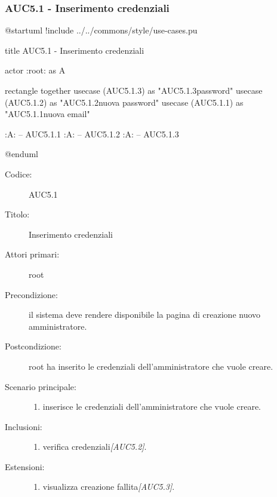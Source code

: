\documentclass[casi-duso]{subfiles}
\begin{document}
\subsubsection{AUC5.1 - Inserimento credenziali}%
\label{subsub:AUC5.1}

\begin{plantuml}
@startuml
!include ../../commons/style/use-cases.pu

title AUC5.1 - Inserimento credenziali

actor :root: as A

rectangle {
  together {
    usecase (AUC5.1.3) as "AUC5.1.3\nConferma password"
    usecase (AUC5.1.2) as "AUC5.1.2\nInserimento nuova password"
    usecase (AUC5.1.1) as "AUC5.1.1\nInserimento nuova email"
  }
}

:A: -- AUC5.1.1
:A: -- AUC5.1.2
:A: -- AUC5.1.3

@enduml
\end{plantuml}

\begin{description}
  \item[Codice:] AUC5.1
  \item[Titolo:] Inserimento credenziali
  \item[Attori primari:] root
  \item[Precondizione:] il sistema deve rendere disponibile la pagina di creazione nuovo amministratore.
  \item[Postcondizione:] root ha inserito le credenziali dell'amministratore che vuole creare.
  \item[Scenario principale:]
  \begin{enumerate}
    \item {} inserisce le credenziali dell'amministratore che vuole creare.
  \end{enumerate}
  \item[Inclusioni:]
  \begin{enumerate}
    \item verifica credenziali\emph{[AUC5.2]}.
  \end{enumerate}
  \item[Estensioni:]
  \begin{enumerate}
    \item  visualizza creazione fallita\emph{[AUC5.3]}.
  \end{enumerate}
\end{description}
\end{document}
